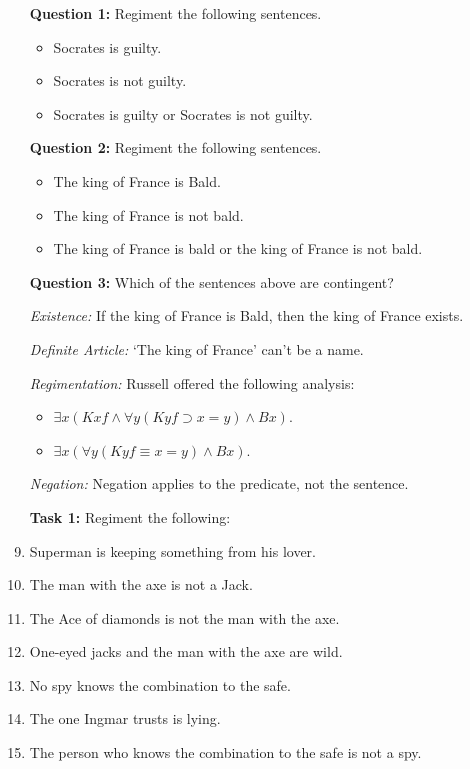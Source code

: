 \documentclass[a4paper, 11pt]{article} %
\begin{document}
\begin{enumerate}
  \item[\bf Question 1:] Regiment the following sentences.
    \begin{itemize}
      \item Socrates is guilty.
      \item Socrates is not guilty.
      \item Socrates is guilty or Socrates is not guilty.
    \end{itemize}
  \item[\bf Question 2:] Regiment the following sentences.
    \begin{itemize}
      \item The king of France is Bald.
      \item The king of France is not bald.
      \item The king of France is bald or the king of France is not bald.
    \end{itemize}
  \item[\bf Question 3:] Which of the sentences above are contingent?
  \item[\it Existence:] If the king of France is Bald, then the king of France exists.
  \item[\it Definite Article:] `The king of France' can't be a name.
  \item[\it Regimentation:] Russell offered the following analysis:
    \begin{itemize}
      \item $\exists x(Kxf \wedge \forall y(Kyf \supset x=y) \wedge Bx)$.
      \item $\exists x(\forall y(Kyf \equiv x=y) \wedge Bx)$.
    \end{itemize}
  \item[\it Negation:] Negation applies to the predicate, not the sentence.
  \item[\bf Task 1:] Regiment the following:
  \item Superman is keeping something from his lover.
  \item The man with the axe is not a Jack.
  \item The Ace of diamonds is not the man with the axe.
  \item One-eyed jacks and the man with the axe are wild.
  \item No spy knows the combination to the safe.
  \item The one Ingmar trusts is lying.
  \item The person who knows the combination to the safe is not a spy.
\end{enumerate}
\end{document}
